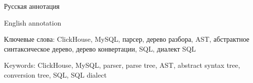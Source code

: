 Русская аннотация

English annotation

Ключевые слова: ClickHouse, MySQL, парсер, дерево разбора, AST, абстрактное синтаксическое дерево, дерево конвертации, SQL, диалект SQL

Keywords: ClickHouse, MySQL, parser, parse tree, AST, abstract syntax tree, conversion tree, SQL, SQL dialect

\pagebreak
